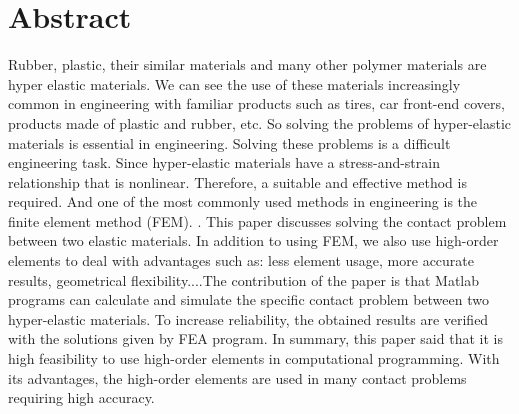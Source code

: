 \chapter*{\centering Abstract}%

Rubber, plastic, their similar materials and many other polymer materials are hyper elastic materials. We can see the use of these materials increasingly common in engineering with familiar products such as tires, car front-end covers, products made of plastic and rubber, etc. So solving the problems of hyper-elastic materials is essential in engineering. Solving these problems is a difficult engineering task. Since hyper-elastic materials have a stress-and-strain relationship that is nonlinear. Therefore, a suitable and effective method is required. And one of the most commonly used methods in engineering is the finite element method (FEM). . This paper discusses solving the contact problem between two elastic materials. In addition to using FEM, we also use high-order elements to deal with advantages such as: less element usage, more accurate results, geometrical flexibility....The contribution of the paper is that Matlab programs can calculate and simulate the specific contact problem between two hyper-elastic materials. To increase reliability, the obtained results are verified with the solutions given by FEA program. In summary, this paper said that it is high feasibility to use high-order elements in computational programming. With its advantages, the high-order elements are used in many contact problems requiring high accuracy. 